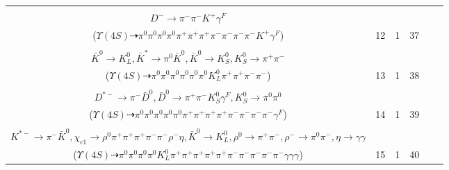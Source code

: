 \documentclass[landscape]{article}
\newcounter{rownumbers}
\newcommand\rn{\stepcounter{rownumbers}\arabic{rownumbers}}
\newcommand{\EOLP}{\\ \hline} %
\newcommand{\topoTags}[1]{#1} %
\begin{document}
\begin{longtable}{clcccc}
\rn & \makecell[l]{ $ 
\Upsilon(4S) \rightarrow B^{0} B^{0} ,
B^{0} \rightarrow \pi^{0} \bar{D}^{0} ,
B^{0} \rightarrow \rho^{0} \pi^{+} \pi^{+} \pi^{-} D^{*-} ,
\bar{D}^{0} \rightarrow \pi^{0} \pi^{0} ,
\rho^{0} \rightarrow \pi^{+} \pi^{-} ,
D^{*-} \rightarrow \pi^{0} D^{-} ,
$ \\ $
D^{-} \rightarrow \pi^{-} \pi^{-} K^{+} \gamma^{F} 
$ \\ ($
\Upsilon(4S) \dashrightarrow \pi^{0} \pi^{0} \pi^{0} \pi^{0} \pi^{+} \pi^{+} \pi^{+} \pi^{-} \pi^{-} \pi^{-} \pi^{-} K^{+} \gamma^{F} 
$) } & \topoTags{12 & }1 & 37 \EOLP

\rn & \makecell[l]{ $ 
\Upsilon(4S) \rightarrow B^{0} \bar{B}^{0} ,
B^{0} \rightarrow \pi^{0} \bar{D}^{0} ,
\bar{B}^{0} \rightarrow \bar{K}^{*} D^{0} ,
\bar{D}^{0} \rightarrow \pi^{0} \pi^{0} ,
\bar{K}^{*} \rightarrow \pi^{0} \bar{K}^{0} ,
D^{0} \rightarrow \pi^{0} \pi^{+} \pi^{-} \bar{K}^{*} ,
$ \\ $
\bar{K}^{0} \rightarrow K_{L}^{0} ,
\bar{K}^{*} \rightarrow \pi^{0} \bar{K}^{0} ,
\bar{K}^{0} \rightarrow K_{S}^{0} ,
K_{S}^{0} \rightarrow \pi^{+} \pi^{-} 
$ \\ ($
\Upsilon(4S) \dashrightarrow \pi^{0} \pi^{0} \pi^{0} \pi^{0} \pi^{0} \pi^{0} K_{L}^{0} \pi^{+} \pi^{+} \pi^{-} \pi^{-} 
$) } & \topoTags{13 & }1 & 38 \EOLP

\rn & \makecell[l]{ $ 
\Upsilon(4S) \rightarrow B^{0} B^{0} ,
B^{0} \rightarrow \pi^{0} \bar{D}^{0} ,
B^{0} \rightarrow \rho^{0} \rho^{0} \pi^{+} D^{*-} ,
\bar{D}^{0} \rightarrow \pi^{0} \pi^{0} ,
\rho^{0} \rightarrow \pi^{+} \pi^{-} ,
\rho^{0} \rightarrow \pi^{+} \pi^{-} ,
$ \\ $
D^{*-} \rightarrow \pi^{-} \bar{D}^{0} ,
\bar{D}^{0} \rightarrow \pi^{+} \pi^{-} K_{S}^{0} \gamma^{F} ,
K_{S}^{0} \rightarrow \pi^{0} \pi^{0} 
$ \\ ($
\Upsilon(4S) \dashrightarrow \pi^{0} \pi^{0} \pi^{0} \pi^{0} \pi^{0} \pi^{+} \pi^{+} \pi^{+} \pi^{+} \pi^{-} \pi^{-} \pi^{-} \pi^{-} \gamma^{F} 
$) } & \topoTags{14 & }1 & 39 \EOLP

\rn & \makecell[l]{ $ 
\Upsilon(4S) \rightarrow B^{0} \bar{B}^{0} ,
B^{0} \rightarrow \pi^{0} \bar{D}^{0} ,
\bar{B}^{0} \rightarrow \bar{K}_1^{0} \psi^{\prime} ,
\bar{D}^{0} \rightarrow \pi^{0} \pi^{0} ,
\bar{K}_1^{0} \rightarrow \pi^{+} K^{*-} ,
\psi^{\prime} \rightarrow \chi_{c1} \gamma ,
$ \\ $
K^{*-} \rightarrow \pi^{-} \bar{K}^{0} ,
\chi_{c1} \rightarrow \rho^{0} \pi^{+} \pi^{+} \pi^{+} \pi^{-} \pi^{-} \rho^{-} \eta ,
\bar{K}^{0} \rightarrow K_{L}^{0} ,
\rho^{0} \rightarrow \pi^{+} \pi^{-} ,
\rho^{-} \rightarrow \pi^{0} \pi^{-} ,
\eta \rightarrow \gamma \gamma 
$ \\ ($
\Upsilon(4S) \dashrightarrow \pi^{0} \pi^{0} \pi^{0} \pi^{0} K_{L}^{0} \pi^{+} \pi^{+} \pi^{+} \pi^{+} \pi^{+} \pi^{-} \pi^{-} \pi^{-} \pi^{-} \pi^{-} \gamma \gamma \gamma 
$) } & \topoTags{15 & }1 & 40 \EOLP


\end{longtable}
\end{document}
